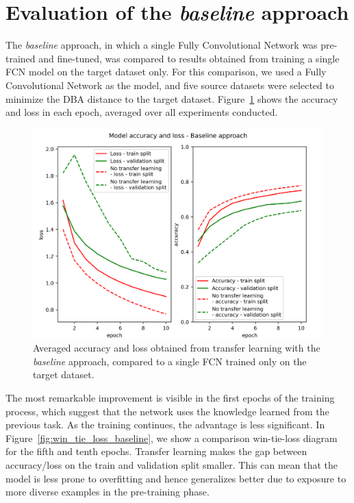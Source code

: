 \documentclass[a4paper,11pt,twoside]{report}
\theoremstyle{definition}
\begin{document}
\section{Evaluation of the \textit{baseline} approach}
The \textit{baseline} approach, in which a single Fully Convolutional Network was pre-trained and fine-tuned, was compared to results obtained from training a single FCN model on the target dataset only. For this comparison, we used a Fully Convolutional Network as the model, and five source datasets were selected to minimize the DBA distance to the target dataset. Figure~\ref{fig:baseline_acc} shows the accuracy and loss in each epoch, averaged over all experiments conducted.


\FloatBarrier

\begin{figure}[h!t]
\centering
\includegraphics[width=17 cm]{imgs/baseline/loss_acc.png}
\caption{Averaged accuracy and loss obtained from transfer learning with the \textit{baseline} approach, compared to a single FCN trained only on the target dataset.}
\label{fig:baseline_acc}
\end{figure}
\FloatBarrier
The most remarkable improvement is visible in the first epochs of the training process, which suggest that the network uses the knowledge learned from the previous task. As the training continues, the advantage is less significant. In Figure~\ref{fig:win_tie_loss_baseline}, we show a comparison win-tie-loss diagram for the fifth and tenth epochs.
Transfer learning makes the gap between accuracy/loss on the train and validation split smaller. This can mean that the model is less prone to overfitting and hence generalizes better due to exposure to more diverse examples in the pre-training phase.
\end{document}
